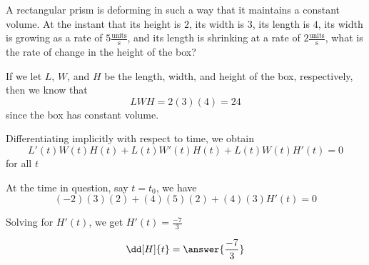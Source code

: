 \documentclass{ximera}
\author{Steven Gubkin}
\begin{document}
\begin{exercise}



A rectangular prism is deforming in such a way that it maintains a
constant volume.  At the instant that its height is $2$, its width is
$3$, its length is $4$, its width is growing as a rate of $5
\frac{\textrm{units}}{\textrm{s}}$, and its length is shrinking at a
rate of $2 \frac{\textrm{units}}{\textrm{s}}$, what is the rate of
change in the height of the box?

\begin{hint}
If we let $L$, $W$, and $H$ be the length, width, and height of the
box, respectively, then we know that
\[
LWH = 2(3)(4) = 24
\]
since the box has constant volume.
\end{hint}

\begin{hint}	
  Differentiating implicitly with respect to time, we obtain
\[
L'(t)W(t)H(t)+L(t)W'(t)H(t)+L(t)W(t)H'(t) = 0
\]
for all $t$
\end{hint}

\begin{hint}
  At the time in question, say $t = t_0$, we have
\[
(-2)(3)(2)+(4)(5)(2)+(4)(3)H'(t) = 0
\]
\end{hint}

\begin{hint}	
  Solving for $H'(t)$, we get $H'(t) = \frac{-7}{3}$
\end{hint}

\begin{prompt}
  \[
  \dd[H]{t} = \answer{\frac{-7}{3}}
  \]
\end{prompt}

\end{exercise}
\end{document}
